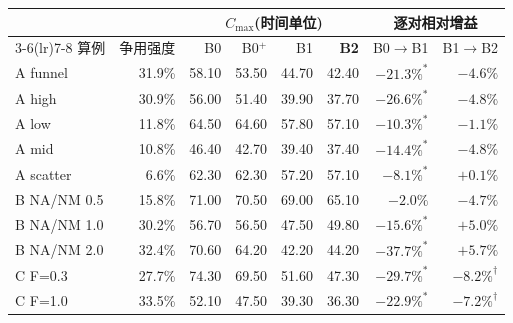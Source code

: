 \begin{tabular}{@{}lrrrrrrr@{}}
\toprule
& & \multicolumn{4}{c}{$C_{\max}$(时间单位)} & \multicolumn{2}{c}{逐对相对增益} \\
\cmidrule(lr){3-6}\cmidrule(lr){7-8}
算例 & 争用强度 & B0 & B0$^{+}$ & B1 & \textbf{B2} & B0$\rightarrow$B1 & B1$\rightarrow$B2 \\
\midrule
A funnel & 31.9\% & 58.10 & 53.50 & 44.70 & 42.40 & $-21.3\%^{*}$ & $-4.6\%$ \\
A high & 30.9\% & 56.00 & 51.40 & 39.90 & 37.70 & $-26.6\%^{*}$ & $-4.8\%$ \\
A low & 11.8\% & 64.50 & 64.60 & 57.80 & 57.10 & $-10.3\%^{*}$ & $-1.1\%$ \\
A mid & 10.8\% & 46.40 & 42.70 & 39.40 & 37.40 & $-14.4\%^{*}$ & $-4.8\%$ \\
A scatter & 6.6\% & 62.30 & 62.30 & 57.20 & 57.10 & $-8.1\%^{*}$ & $+0.1\%$ \\
\midrule
B NA/NM 0.5 & 15.8\% & 71.00 & 70.50 & 69.00 & 65.10 & $-2.0\%$ & $-4.7\%$ \\
B NA/NM 1.0 & 30.2\% & 56.70 & 56.50 & 47.50 & 49.80 & $-15.6\%^{*}$ & $+5.0\%$ \\
B NA/NM 2.0 & 32.4\% & 70.60 & 64.20 & 42.20 & 44.20 & $-37.7\%^{*}$ & $+5.7\%$ \\
\midrule
C F=0.3 & 27.7\% & 74.30 & 69.50 & 51.60 & 47.30 & $-29.7\%^{*}$ & $-8.2\%^{\dagger}$ \\
C F=1.0 & 33.5\% & 52.10 & 47.50 & 39.30 & 36.30 & $-22.9\%^{*}$ & $-7.2\%^{\dagger}$ \\
\bottomrule
\end{tabular}
